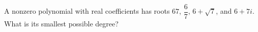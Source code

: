 A nonzero polynomial with real coefficients has roots $67$, $\dfrac{6}{7}$, $6+\sqrt7$, and $6+7i$. What is its smallest possible degree?
